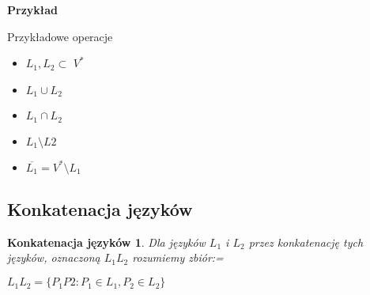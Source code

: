 	
	\begin{tcolorbox}
	
		\textbf{Przykład} \newline
		\begin{center}
		\end{center}
	
		Przykładowe operacje
		\begin{itemize}
		  \item $L_{1}, L_{2} \subset$ $V^{*}$
		  \item $L_{1} \cup L_{2}$
		  \item $L_{1} \cap L_{2}$
		  \item $L_{1} \setminus L{2}$
		  \item $\overline{L_{1}} = V^{*} \setminus L_{1}$
		\end{itemize}
	

\end{tcolorbox}


\subsection{Konkatenacja języków}

\newtheorem*{theorem19*}{Konkatenacja języków}
\begin{theorem19*}
Dla języków $L_{1}$ i $L_{2}$ przez konkatenację tych języków, oznaczoną $L_{1}L_{2}$ rozumiemy zbiór:=
	\begin{center}
		$L_{1}L_{2} =\{P_{1}P{2}: P_{1} \in L_{1}, P_{2} \in L_{2}\}$
	\end{center}
\end{theorem19*}


